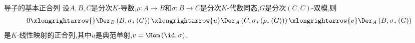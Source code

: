 \begin{proposition}{导子的基本正合列}{}
	设$A,B,C$是分次$K$-导数,$\rho:A\to B$和$\sigma:B\to C$是分次$K$-代数同态,$G$是分次$\left(C,C\right)$-双模,则
	\begin{align*}
		0\xlongrightarrow{}\Der_{B}\left(B,\sigma_{\ast}\left(G\right)\right)\xlongrightarrow{u}\Der_{A}\left(C,\sigma_{\ast}\left(\rho_{\ast}\left(G\right)\right)\right)\xlongrightarrow{v}\Der_{A}\left(B,\sigma_{\ast}\left(G\right)\right)
	\end{align*}
	是$K$-线性映射的正合列,其中$u$是典范单射,$v=\Hom\left(\id,\sigma\right)$.
\end{proposition}











































